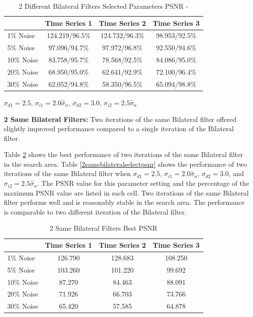 \documentclass[11pt]{article}
\newcommand{\vs}{\vspace{0.1in}}
\theoremstyle{definition}
\begin{document}
\begin{table}[!h]
\small
\begin{center}
\begin{tabular}{l | c | c | c}
 & Time Series 1 & Time Series 2 & Time Series 3 \\ \hline
1\% Noise & 124.219/96.5\% & 124.732/96.3\% & 98.953/92.5\% \\ \hline
5\% Noise & 97.096/94.7\% & 97.972/96.8\% & 92.550/94.6\% \\ \hline
10\% Noise & 83.758/95.7\% & 78.568/92.5\% & 84.086/95.0\% \\ \hline
20\% Noise & 68.950/95.0\% & 62.641/92.9\% & 72.100/96.4\% \\ \hline
30\% Noise & 62.052/94.8\% & 58.350/96.5\% & 65.094/98.8\%
\end{tabular}
\caption{2 Different Bilateral Filters Selected Parameters PSNR -}
 $\sigma_{d1} = 2.5$, $\sigma_{i1} = 2.0 \hat{\sigma}_n$, $\sigma_{d2} = 3.0$, $\sigma_{i2} = 2.5 \hat{\sigma}_n$
\label{2diffbilateralselectpsnr}
\end{center}
\end{table}

\vs
\textbf{2 Same Bilateral Filters:} Two iterations of the same Bilateral filter offered slightly improved performance compared to a single iteration of the Bilateral filter.

Table \ref{2samebilateralbestpsnr} shows the best performance of two iterations of the same Bilateral filter in the search area. Table \ref{2samebilateralselectpsnr} shows the performance of two iterations of the same Bilateral filter when $\sigma_{d1} = 2.5$, $\sigma_{i1} = 2.0 \hat{\sigma}_n$, $\sigma_{d2} = 3.0$, and $\sigma_{i2} = 2.5 \hat{\sigma}_n$. The PSNR value for this parameter setting and the percentage of the maximum PSNR value are listed in each cell. Two iterations of the same Bilateral filter performs well and is reasonably stable in the search area. The performance is comparable to two different iteration of the Bilateral filter.

\begin{table}[!h]
\small
\begin{center}
\begin{tabular}{l | c | c | c}
 & Time Series 1 & Time Series 2 & Time Series 3 \\ \hline
1\% Noise & 126.790 & 128.683 & 108.250 \\ \hline
5\% Noise & 103.260 & 101.220 & 99.692 \\ \hline
10\% Noise & 87.270 & 84.463 & 88.091 \\ \hline
20\% Noise & 71.926 & 66.703 & 73.766 \\ \hline
30\% Noise & 65.420 & 57.585 & 64.878
\end{tabular}
\caption{2 Same Bilateral Filters Best PSNR}
\label{2samebilateralbestpsnr}
\end{center}
\end{table}
\end{document}

